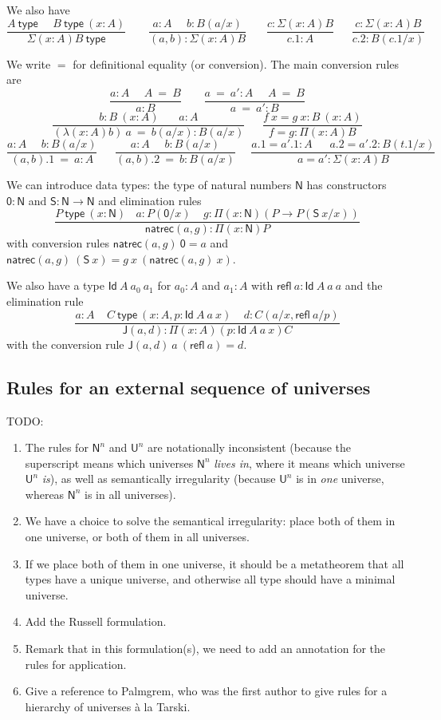 \documentclass[11pt,a4paper]{article}
\newcommand{\refl}{\mathsf{refl}}
\newcommand{\Id}{\mathsf{Id}}
\newcommand{\conv}{=}
\def\NN{\mathsf{N}}
\def\UU{\mathsf{U}}
\def\JJ{\mathsf{J}}
\def\ZERO{\mathsf{0}}
\def\SUCC{\mathsf{S}}
\newcommand{\type}{\mathsf{type}}
\newcommand{\natrec}{\mathsf{natrec}}
\begin{document}
We also have
$$
\frac{A~\type~~~~~~B~\type~(x:A)}{\Sigma (x:A) B~\type}~~~~~~~~~
\frac{a:A~~~~~~b:B(a/x)}{(a,b):\Sigma (x:A) B}~~~~~~~~
\frac{c:\Sigma (x:A) B}{c.1:A}~~~~~~~
\frac{c:\Sigma (x:A) B}{c.2:B(c.1/x)}
$$

We write $\conv$ for definitional equality (or conversion). The main conversion rules are
$$
\frac{ a:A~~~~~~ A~ \conv~ B}{ a:B}~~~~~~~~~
\frac{ a ~\conv~a':A~~~~~~ A  ~\conv~ B}{ a ~\conv~a':B}
$$
$$
\frac{b:B~(x:A)~~~~~~~~ a:A}{ (\lambda (x:A)b)~a  ~\conv~ b(a/x):B(a/x)}
~~~~~~~
\frac{f~x = g~x:B~(x:A)}{ f = g : \Pi (x:A)B}
$$
$$
\frac{ a:A~~~~~~ b:B(a/x)}{ (a,b).1  ~\conv~ a:A}
~~~~~~~
\frac{ a:A~~~~~~ b:B(a/x)}{ (a,b).2  ~\conv~ b:B(a/x)}~~~~~~
\frac{ a.1 = a'.1:A~~~~~~~ a.2 = a'.2:B(t.1/x)}{ a = a' : \Sigma (x:A)B}
$$

We can introduce data types: the type of natural numbers $\NN$ has
constructors $\ZERO:\NN$ and $\SUCC:\NN\rightarrow\NN$ and elimination rules
$$
\frac{P~\type~(x:\NN)~~~~a:P(\ZERO/x)~~~~~g:\Pi (x:\NN)(P\rightarrow P(\SUCC~x/x))}{\natrec(a,g):\Pi (x:\NN)P}
$$
with conversion rules $\natrec(a,g)~\ZERO = a$ and $\natrec(a,g)~(\SUCC~x) = g~x~(\natrec(a,g)~x)$.

We also have a type $\Id~A~a_0~a_1$ for $a_0:A$ and $a_1:A$ with $\refl~a:\Id~A~a~a$
and the elimination rule
$$\frac{a:A~~~~~C~\type~(x:A,p:\Id~A~a~x)~~~~~d:C(a/x,\refl~a/p)}{\JJ (a,d):\Pi (x:A)(p:\Id~A~a~x)C}$$
with the conversion rule $\JJ(a,d)~a~(\refl~a) = d$.

\subsection*{Rules for an external sequence of universes}

TODO:
\begin{enumerate}
\item The rules for $\NN^n$ and $\UU^n$ are notationally inconsistent (because the superscript means which universes $\NN^n$ \emph{lives in}, where it means which universe $\UU^n$ \emph{is}), as well as semantically irregularity (because $\UU^n$ is in \emph{one} universe, whereas $\NN^n$ is in all universes).
\item We have a choice to solve the semantical irregularity: place both of them in one universe, or both of them in all universes.
\item If we place both of them in one universe, it should be a metatheorem that all types have a unique universe, and otherwise all type should have a minimal universe.
\item Add the Russell formulation.
\item Remark that in this formulation(s), we need to add an annotation for the rules for application.
\item Give a reference to Palmgrem, who was the first author to give rules for a hierarchy of universes \`a la Tarski.
\end{enumerate}
\end{document}
